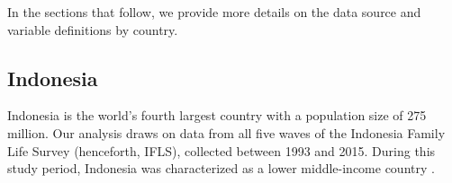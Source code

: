 \documentclass[12pt]{article}
\begin{document}
In the sections that follow, we provide more details on the data source and variable definitions by country.

\subsection{Indonesia}\label{subsec:Indonesia-data}
Indonesia is the world's fourth largest country with a population size of 275 million. Our analysis draws on data from all five waves of the Indonesia Family Life Survey (henceforth, IFLS), collected between 1993 and 2015. During this study period, Indonesia was characterized as a lower middle-income country \citep{worldbank2024wdi}.
\end{document}
